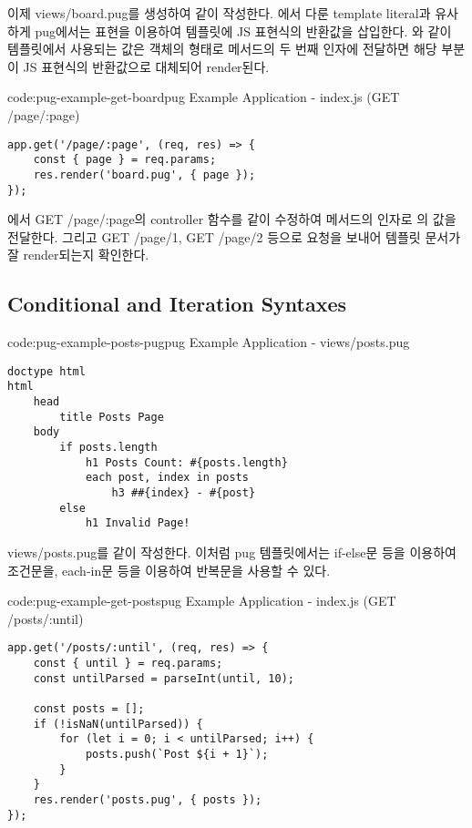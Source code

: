 이제 views/board.pug를 생성하여 \와 같이 작성한다. 에서 다룬 template literal과 유사하게 pug에서는 \cd{\#\{\}} 표현을 이용하여 템플릿에 JS 표현식의 반환값을 삽입한다. 와 같이 템플릿에서 사용되는 값은 객체의 형태로  메서드의 두 번째 인자에 전달하면 해당 부분이 JS 표현식의 반환값으로 대체되어 render된다.

\begin{codeenv}{code:pug-example-get-board}{pug Example Application - index.js (GET /page/:page)}\begin{verbatim}
app.get('/page/:page', (req, res) => {
    const { page } = req.params;
    res.render('board.pug', { page });
});
\end{verbatim}
\end{codeenv}

에서 GET /page/:page의 controller 함수를 \와 같이 수정하여  메서드의 인자로 의 값을 전달한다. 그리고 GET /page/1, GET /page/2 등으로 요청을 보내어 템플릿 문서가 잘 render되는지 확인한다.
\newpage

\subsection*{Conditional and Iteration Syntaxes}

\begin{codeenv}{code:pug-example-posts-pug}{pug Example Application - views/posts.pug}\begin{verbatim}
doctype html
html
    head
        title Posts Page
    body
        if posts.length
            h1 Posts Count: #{posts.length}
            each post, index in posts
                h3 ##{index} - #{post}
        else
            h1 Invalid Page!
\end{verbatim}
\end{codeenv}

views/posts.pug를 \와 같이 작성한다. 이처럼 pug 템플릿에서는 if-else문 등을 이용하여 조건문을, each-in문 등을 이용하여 반복문을 사용할 수 있다.

\begin{codeenv}{code:pug-example-get-posts}{pug Example Application - index.js (GET /posts/:until)}\begin{verbatim}
app.get('/posts/:until', (req, res) => {
    const { until } = req.params;
    const untilParsed = parseInt(until, 10);

    const posts = [];
    if (!isNaN(untilParsed)) {
        for (let i = 0; i < untilParsed; i++) {
            posts.push(`Post ${i + 1}`);
        }
    }
    res.render('posts.pug', { posts });
});
\end{verbatim}
\end{codeenv}

